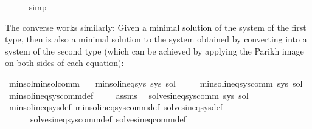 \begin{isabellebody}
\ \ \ \ \isamarkupfalse%
\ simp\isanewline
{}\isamarkupfalse%
%
\endisatagproof
{\isafoldproof}%
%
\isadelimproof
%
\endisadelimproof
%
\begin{isamarkuptext}%
The converse works similarly: Given a minimal solution  of the system  of the first type,
then  is also a minimal solution to the system obtained by converting  into a system of the second
type (which can be achieved by applying the Parikh image on both sides of each equation):%
\end{isamarkuptext}\isamarkuptrue%
\isamarkupfalse%
\ min{\isacharunderscore}{\kern0pt}sol{\isacharunderscore}{\kern0pt}min{\isacharunderscore}{\kern0pt}sol{\isacharunderscore}{\kern0pt}comm{\isacharcolon}{\kern0pt}\isanewline
\ \ \ {\isachardoublequoteopen}min{\isacharunderscore}{\kern0pt}sol{\isacharunderscore}{\kern0pt}ineq{\isacharunderscore}{\kern0pt}sys\ sys\ sol{\isachardoublequoteclose}\isanewline
\ \ \ \ \ {\isachardoublequoteopen}min{\isacharunderscore}{\kern0pt}sol{\isacharunderscore}{\kern0pt}ineq{\isacharunderscore}{\kern0pt}sys{\isacharunderscore}{\kern0pt}comm\ sys\ sol{\isachardoublequoteclose}\isanewline
%
\isadelimproof
%
\endisadelimproof
%
\isatagproof
{}\isamarkupfalse%
\ min{\isacharunderscore}{\kern0pt}sol{\isacharunderscore}{\kern0pt}ineq{\isacharunderscore}{\kern0pt}sys{\isacharunderscore}{\kern0pt}comm{\isacharunderscore}{\kern0pt}def\ \isamarkupfalse%
\isanewline
\ \ \isamarkupfalse%
\ assms\ \isamarkupfalse%
\ {\isachardoublequoteopen}solves{\isacharunderscore}{\kern0pt}ineq{\isacharunderscore}{\kern0pt}sys{\isacharunderscore}{\kern0pt}comm\ sys\ sol{\isachardoublequoteclose}\isanewline
\ \ \ \ \isamarkupfalse%
\ min{\isacharunderscore}{\kern0pt}sol{\isacharunderscore}{\kern0pt}ineq{\isacharunderscore}{\kern0pt}sys{\isacharunderscore}{\kern0pt}def\ min{\isacharunderscore}{\kern0pt}sol{\isacharunderscore}{\kern0pt}ineq{\isacharunderscore}{\kern0pt}sys{\isacharunderscore}{\kern0pt}comm{\isacharunderscore}{\kern0pt}def\ solves{\isacharunderscore}{\kern0pt}ineq{\isacharunderscore}{\kern0pt}sys{\isacharunderscore}{\kern0pt}def\isanewline
\ \ \ \ \ \ solves{\isacharunderscore}{\kern0pt}ineq{\isacharunderscore}{\kern0pt}sys{\isacharunderscore}{\kern0pt}comm{\isacharunderscore}{\kern0pt}def\ solves{\isacharunderscore}{\kern0pt}ineq{\isacharunderscore}{\kern0pt}comm{\isacharunderscore}{\kern0pt}def\ \isamarkupfalse%

\end{isabellebody}
